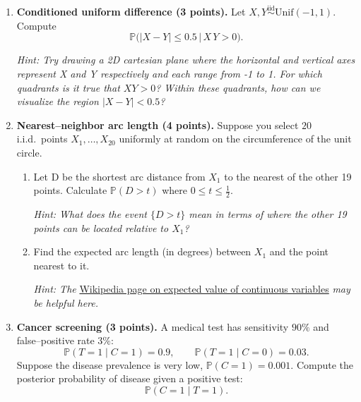 \documentclass[11pt]{article}
\newcommand{\PP}{\mathbb{P}}
\begin{document}
\begin{enumerate}[label=\arabic*., resume]

    \item \textbf{Conditioned uniform difference (3 points).}
          Let $X,Y\stackrel{\text{iid}}{\sim}\text{Unif}(-1,1)$. Compute
          \[
             \PP\!\bigl(|X-Y|\le 0.5 \,\bigl|\, X\,Y>0\bigr).
          \]

            \textit{Hint: Try drawing a 2D cartesian plane where the horizontal and vertical axes represent X and Y respectively and each range from -1 to 1. For which quadrants is it true that $XY > 0$? Within these quadrants, how can we visualize the region $|X-Y| < 0.5$?}


        
    \newpage

    \item \textbf{Nearest–neighbor arc length (4 points).}
        Suppose you select $20$ i.i.d.\ points $X_1,\dots,X_{20}$ uniformly at random on the
        circumference of the unit circle. 

        \begin{enumerate}
            \item Let D be the shortest arc distance from $X_1$ to the nearest of the other 19 points. Calculate $\mathbb{P}(D > t)$ where $0 \leq t \leq \frac{1}{2}$.

            \textit{Hint: What does the event $\{D > t\}$ mean in terms of where the other 19 points can be located relative to $X_1$?}

            

            \item Find the expected arc length (in degrees)
            between $X_1$ and the point nearest to it. 
            
            \textit{Hint: The} \href{https://en.wikipedia.org/wiki/Expected_value#Random_variables_with_density}{Wikipedia page on expected value of continuous variables} \textit{may be helpful here.}



        \end{enumerate}
    \newpage


    \item \textbf{Cancer screening (3 points).}
          A medical test has sensitivity $90\%$ and false–positive rate $3\%$:
          \[
          \PP(T=1\mid C=1)=0.9,\qquad \PP(T=1\mid C=0)=0.03.
          \]
          Suppose the disease prevalence is very low, $\PP(C=1)=0.001$. Compute the posterior probability of disease given a positive test:
          \[
          \PP(C=1\mid T=1).
          \]


\end{enumerate}
\end{document}
